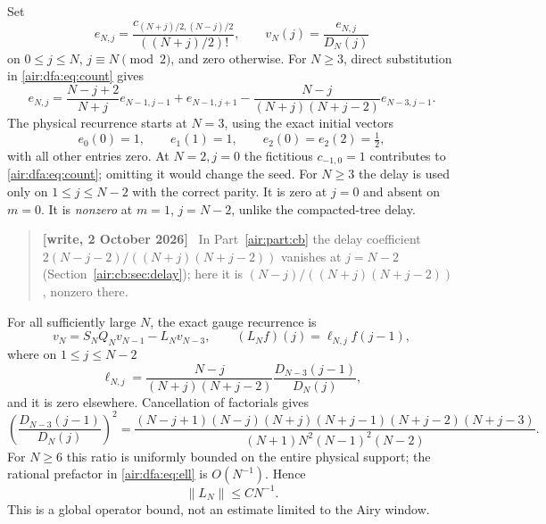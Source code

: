\documentclass[11pt,letterpaper]{article}
\numberwithin{equation}{section}
\theoremstyle{remark}
\newcommand{\norm}[1]{\left\lVert#1\right\rVert}
\newenvironment{writenote}{\par\smallskip\begin{quote}\small\textbf{[write, 2 October 2026]}\ }{\end{quote}\smallskip}
\begin{document}
Set
\[
e_{N,j}=\frac{c_{(N+j)/2,(N-j)/2}}{((N+j)/2)!},\qquad
v_N(j)=\frac{e_{N,j}}{D_N(j)}
\]
on $0\le j\le N$, $j\equiv N\pmod2$, and zero otherwise. For $N\ge3$, direct substitution in \eqref{air:dfa:eq:count} gives
\begin{equation}\label{air:dfa:eq:ungauged-delay}
e_{N,j}=\frac{N-j+2}{N+j}e_{N-1,j-1}+e_{N-1,j+1}
-\frac{N-j}{(N+j)(N+j-2)}e_{N-3,j-1}.
\end{equation}
The physical recurrence starts at $N=3$, using the exact initial vectors
\[
e_0(0)=1,\qquad e_1(1)=1,\qquad e_2(0)=e_2(2)=\tfrac12,
\]
with all other entries zero. At $N=2,j=0$ the fictitious $c_{-1,0}=1$
contributes to \eqref{air:dfa:eq:count}; omitting it would change the seed.
For $N\ge3$ the delay is used only on $1\le j\le N-2$ with the correct
parity. It is zero at $j=0$ and absent on $m=0$. It is \emph{nonzero}
at $m=1$, $j=N-2$, unlike the compacted-tree delay.
\begin{writenote}
In Part~\ref{air:part:cb} the delay coefficient $2(N-j-2)/((N+j)(N+j-2))$ vanishes at $j=N-2$ (Section~\ref{air:cb:sec:delay}); here it is $(N-j)/((N+j)(N+j-2))$, nonzero there.
\end{writenote}


For all sufficiently large $N$, the exact gauge recurrence is
\begin{equation}\label{air:dfa:eq:gauged-delay}
v_N=S_NQ_Nv_{N-1}-L_Nv_{N-3},\qquad
(L_Nf)(j)=\ell_{N,j}f(j-1),
\end{equation}
where on $1\le j\le N-2$
\begin{equation}\label{air:dfa:eq:ell}
\ell_{N,j}=\frac{N-j}{(N+j)(N+j-2)}
\frac{D_{N-3}(j-1)}{D_N(j)},
\end{equation}
and it is zero elsewhere. Cancellation of factorials gives
\begin{equation}\label{air:dfa:eq:gauge-ratio}
\left(\frac{D_{N-3}(j-1)}{D_N(j)}\right)^2
=\frac{(N-j+1)(N-j)(N+j)(N+j-1)(N+j-2)(N+j-3)}
{(N+1)N^2(N-1)^2(N-2)}.
\end{equation}
For $N\ge6$ this ratio is uniformly bounded on the entire physical support;
the rational prefactor in \eqref{air:dfa:eq:ell} is $O(N^{-1})$. Hence
\begin{equation}\label{air:dfa:eq:global-delay}
\norm{L_N}\le C N^{-1}.
\end{equation}
This is a global operator bound, not an estimate limited to the Airy window.
\end{document}
